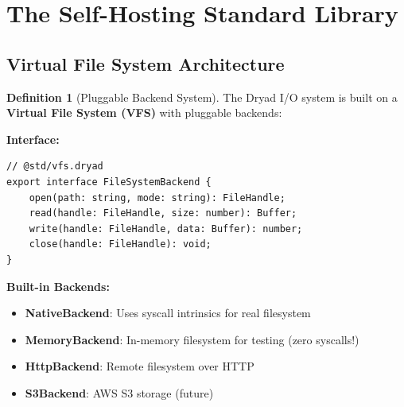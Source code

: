 \documentclass[12pt,a4paper]{article}
\theoremstyle{definition}
\newtheorem{definition}{Definition}[section]
\begin{document}
\newpage

\section{The Self-Hosting Standard Library}

\subsection{Virtual File System Architecture}

\begin{definition}[Pluggable Backend System]
The Dryad I/O system is built on a \textbf{Virtual File System (VFS)} with pluggable backends:

\textbf{Interface:}
\begin{lstlisting}[language=Dryad]
// @std/vfs.dryad
export interface FileSystemBackend {
    open(path: string, mode: string): FileHandle;
    read(handle: FileHandle, size: number): Buffer;
    write(handle: FileHandle, data: Buffer): number;
    close(handle: FileHandle): void;
}
\end{lstlisting}

\textbf{Built-in Backends:}
\begin{itemize}[leftmargin=*]
    \item \textbf{NativeBackend}: Uses syscall intrinsics for real filesystem
    \item \textbf{MemoryBackend}: In-memory filesystem for testing (zero syscalls!)
    \item \textbf{HttpBackend}: Remote filesystem over HTTP
    \item \textbf{S3Backend}: AWS S3 storage (future)
\end{itemize}
\end{definition}
\end{document}
